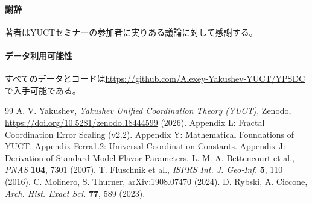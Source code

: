 \documentclass[11pt,a4paper]{article}
\theoremstyle{remark}
\begin{document}
	\paragraph*{謝辞}
	著者はYUCTセミナーの参加者に実りある議論に対して感謝する。
	
	\paragraph*{データ利用可能性}
	すべてのデータとコードは\url{https://github.com/Alexey-Yakushev-YUCT/YPSDC}で入手可能である。
	
	\begin{thebibliography}{99}
		 A. V. Yakushev, \emph{Yakushev Unified Coordination Theory (YUCT)}, Zenodo, \url{https://doi.org/10.5281/zenodo.18444599} (2026).
		 Appendix L: Fractal Coordination Error Scaling (v2.2).
		 Appendix Y: Mathematical Foundations of YUCT.
		 Appendix Ferra1.2: Universal Coordination Constants.
		 Appendix J: Derivation of Standard Model Flavor Parameters.
		 L. M. A. Bettencourt et al., \emph{PNAS} \textbf{104}, 7301 (2007).
		 T. Fluschnik et al., \emph{ISPRS Int. J. Geo‑Inf.} \textbf{5}, 110 (2016).
		 C. Molinero, S. Thurner, arXiv:1908.07470 (2024).
		 D. Rybski, A. Ciccone, \emph{Arch. Hist. Exact Sci.} \textbf{77}, 589 (2023).
	\end{thebibliography}
	
\end{document}
